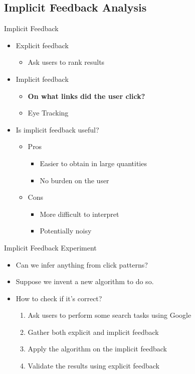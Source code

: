 \subsection{Implicit Feedback Analysis}

\begin{frame}{Implicit Feedback}
  \begin{itemize}
  \item Explicit feedback
    \begin{itemize}
    \item Ask users to rank results
    \end{itemize}

  \item Implicit feedback
    \begin{itemize}
    \item \textbf{On what links did the user click?}
    \item Eye Tracking
    \end{itemize}


  \item Is implicit feedback useful?
    \begin{itemize}
    \item Pros
      \begin{itemize}
        \item Easier to obtain in large quantities
        \item No burden on the user
      \end{itemize}
    \item Cons
      \begin{itemize}
        \item More difficult to interpret
        \item Potentially noisy
      \end{itemize}
    \end{itemize}

  \end{itemize}
\end{frame}

\begin{frame}{Implicit Feedback Experiment}
  \begin{itemize}
  \item Can we infer anything from click patterns? \newline
  \item Suppose we invent a new algorithm to do so. \newline
  \item How to check if it's correct? \newline
    \begin{enumerate}
    \item Ask users to perform some search tasks using Google
    \item Gather both explicit and implicit feedback
    \item Apply the algorithm on the implicit feedback
    \item Validate the results using explicit feedback
    \end{enumerate}
  \end{itemize}
\end{frame}

